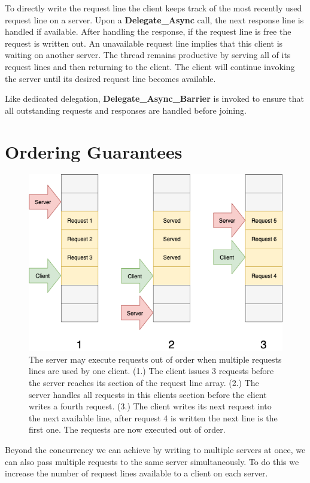 \documentclass{uicthesi}
\begin{document}
To directly write the request line the client keeps track of the most recently used request line on a server. Upon a \textbf{Delegate\_Async} call, the next response line is handled if available. After handling the response, if the request line is free the request is written out. An unavailable request line implies that this client is waiting on another server. The thread remains productive by serving all of its request lines and then returning to the client. The client will continue invoking the server until its desired request line becomes available. 

Like dedicated delegation, \textbf{Delegate\_Async\_Barrier} is invoked to ensure that all outstanding requests and responses are handled before joining. 

\section{Ordering Guarantees}
\begin{figure}[ht!]
\centering
\includegraphics[width=0.9\columnwidth]{FIG/multiple_rl_race.png}
\caption{The server may execute requests out of order when multiple requests lines are used by one client. (1.) The client issues 3 requests before the server reaches its section of the request line array. (2.) The server handles all requests in this clients section before the client writes a fourth request. (3.) The client writes its next request into the next available line, after request 4 is written the next line is the first one. The requests are now executed out of order.}
\label{fig:mulitple_rl_race}
\end{figure}
Beyond the concurrency we can achieve by writing to multiple servers at once, we can also pass multiple requests to the same server simultaneously. To do this we increase the number of request lines available to a client on each server. 
\end{document}
